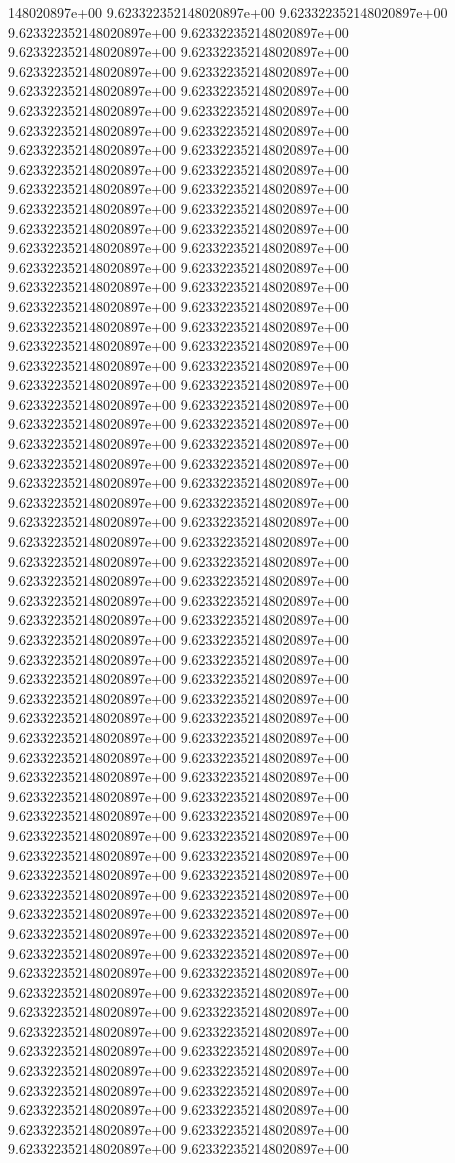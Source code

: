 148020897e+00	9.623322352148020897e+00	9.623322352148020897e+00	9.623322352148020897e+00	9.623322352148020897e+00	9.623322352148020897e+00	9.623322352148020897e+00	9.623322352148020897e+00	9.623322352148020897e+00	9.623322352148020897e+00	9.623322352148020897e+00	9.623322352148020897e+00	9.623322352148020897e+00	9.623322352148020897e+00	9.623322352148020897e+00	9.623322352148020897e+00	9.623322352148020897e+00	9.623322352148020897e+00	9.623322352148020897e+00	9.623322352148020897e+00	9.623322352148020897e+00	9.623322352148020897e+00	9.623322352148020897e+00	9.623322352148020897e+00	9.623322352148020897e+00	9.623322352148020897e+00	9.623322352148020897e+00	9.623322352148020897e+00	9.623322352148020897e+00	9.623322352148020897e+00	9.623322352148020897e+00	9.623322352148020897e+00	9.623322352148020897e+00	9.623322352148020897e+00	9.623322352148020897e+00	9.623322352148020897e+00	9.623322352148020897e+00	9.623322352148020897e+00	9.623322352148020897e+00	9.623322352148020897e+00	9.623322352148020897e+00	9.623322352148020897e+00	9.623322352148020897e+00	9.623322352148020897e+00	9.623322352148020897e+00	9.623322352148020897e+00	9.623322352148020897e+00	9.623322352148020897e+00	9.623322352148020897e+00	9.623322352148020897e+00	9.623322352148020897e+00	9.623322352148020897e+00	9.623322352148020897e+00	9.623322352148020897e+00	9.623322352148020897e+00	9.623322352148020897e+00	9.623322352148020897e+00	9.623322352148020897e+00	9.623322352148020897e+00	9.623322352148020897e+00	9.623322352148020897e+00	9.623322352148020897e+00	9.623322352148020897e+00	9.623322352148020897e+00	9.623322352148020897e+00	9.623322352148020897e+00	9.623322352148020897e+00	9.623322352148020897e+00	9.623322352148020897e+00	9.623322352148020897e+00	9.623322352148020897e+00	9.623322352148020897e+00	9.623322352148020897e+00	9.623322352148020897e+00	9.623322352148020897e+00	9.623322352148020897e+00	9.623322352148020897e+00	9.623322352148020897e+00	9.623322352148020897e+00	9.623322352148020897e+00	9.623322352148020897e+00	9.623322352148020897e+00	9.623322352148020897e+00	9.623322352148020897e+00	9.623322352148020897e+00	9.623322352148020897e+00	9.623322352148020897e+00	9.623322352148020897e+00	9.623322352148020897e+00	9.623322352148020897e+00	9.623322352148020897e+00	9.623322352148020897e+00	9.623322352148020897e+00	9.623322352148020897e+00	9.623322352148020897e+00	9.623322352148020897e+00	9.623322352148020897e+00	9.623322352148020897e+00	9.623322352148020897e+00	9.623322352148020897e+00	9.623322352148020897e+00	9.623322352148020897e+00	9.623322352148020897e+00	9.623322352148020897e+00	9.623322352148020897e+00	9.623322352148020897e+00	9.623322352148020897e+00	9.623322352148020897e+00	9.623322352148020897e+00	9.623322352148020897e+00	9.623322352148020897e+00	9.623322352148020897e+00	9.623322352148020897e+00	9.623322352148020897e+00	9.623322352148020897e+00	9.623322352148020897e+00	9.623322352148020897e+00	9.623322352148020897e+00	9.623322352148020897e+00
